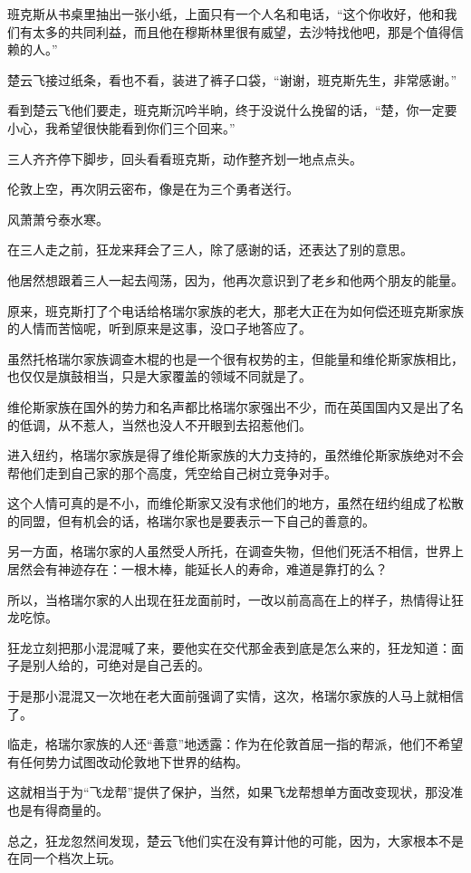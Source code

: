 班克斯从书桌里抽出一张小纸，上面只有一个人名和电话，“这个你收好，他和我们有太多的共同利益，而且他在穆斯林里很有威望，去沙特找他吧，那是个值得信赖的人。”

楚云飞接过纸条，看也不看，装进了裤子口袋，“谢谢，班克斯先生，非常感谢。”

看到楚云飞他们要走，班克斯沉吟半晌，终于没说什么挽留的话，“楚，你一定要小心，我希望很快能看到你们三个回来。”

三人齐齐停下脚步，回头看看班克斯，动作整齐划一地点点头。

伦敦上空，再次阴云密布，像是在为三个勇者送行。

风萧萧兮泰水寒。

在三人走之前，狂龙来拜会了三人，除了感谢的话，还表达了别的意思。

他居然想跟着三人一起去闯荡，因为，他再次意识到了老乡和他两个朋友的能量。

原来，班克斯打了个电话给格瑞尔家族的老大，那老大正在为如何偿还班克斯家族的人情而苦恼呢，听到原来是这事，没口子地答应了。

虽然托格瑞尔家族调查木棍的也是一个很有权势的主，但能量和维伦斯家族相比，也仅仅是旗鼓相当，只是大家覆盖的领域不同就是了。

维伦斯家族在国外的势力和名声都比格瑞尔家强出不少，而在英国国内又是出了名的低调，从不惹人，当然也没人不开眼到去招惹他们。

进入纽约，格瑞尔家族是得了维伦斯家族的大力支持的，虽然维伦斯家族绝对不会帮他们走到自己家的那个高度，凭空给自己树立竞争对手。

这个人情可真的是不小，而维伦斯家又没有求他们的地方，虽然在纽约组成了松散的同盟，但有机会的话，格瑞尔家也是要表示一下自己的善意的。

另一方面，格瑞尔家的人虽然受人所托，在调查失物，但他们死活不相信，世界上居然会有神迹存在：一根木棒，能延长人的寿命，难道是靠打的么？

所以，当格瑞尔家的人出现在狂龙面前时，一改以前高高在上的样子，热情得让狂龙吃惊。

狂龙立刻把那小混混喊了来，要他实在交代那金表到底是怎么来的，狂龙知道：面子是别人给的，可绝对是自己丢的。

于是那小混混又一次地在老大面前强调了实情，这次，格瑞尔家族的人马上就相信了。

临走，格瑞尔家族的人还“善意”地透露：作为在伦敦首屈一指的帮派，他们不希望有任何势力试图改动伦敦地下世界的结构。

这就相当于为“飞龙帮”提供了保护，当然，如果飞龙帮想单方面改变现状，那没准也是有得商量的。

总之，狂龙忽然间发现，楚云飞他们实在没有算计他的可能，因为，大家根本不是在同一个档次上玩。

